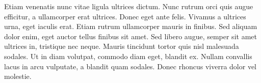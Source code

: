 Etiam venenatis nunc vitae ligula ultrices dictum. Nunc rutrum orci quis augue efficitur, a ullamcorper erat ultrices. Donec eget ante felis. Vivamus a ultrices urna, eget iaculis erat. Etiam rutrum ullamcorper mauris in finibus. Sed aliquam dolor enim, eget auctor tellus finibus sit amet. Sed libero augue, semper sit amet ultrices in, tristique nec neque. Mauris tincidunt tortor quis nisl malesuada sodales. Ut in diam volutpat, commodo diam eget, blandit ex. Nullam convallis lacus in arcu vulputate, a blandit quam sodales. Donec rhoncus viverra dolor vel molestie.